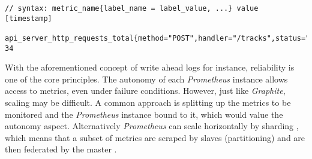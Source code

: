 \begin{lstlisting}[caption=Prometheus exposition format with example, label=listing:prometheusmessage]
// syntax: metric_name{label_name = label_value, ...} value [timestamp]

api_server_http_requests_total{method="POST",handler="/tracks",status="500"} 34
\end{lstlisting}

With the aforementioned concept of write ahead logs for instance, reliability is one of the core principles.
The autonomy of each \textit{Prometheus} instance allows access to metrics, even under failure conditions.
However, just like \textit{Graphite}, scaling may be difficult.
A common approach is splitting up the metrics to be monitored and the \textit{Prometheus} instance bound to it, which would value the autonomy aspect.
Alternatively \textit{Prometheus} can scale horizontally by sharding , which means that a subset of metrics are scraped by slaves (partitioning) and are then federated by the master \cite{Brazil.2015}\cite{Berman.2018}.
